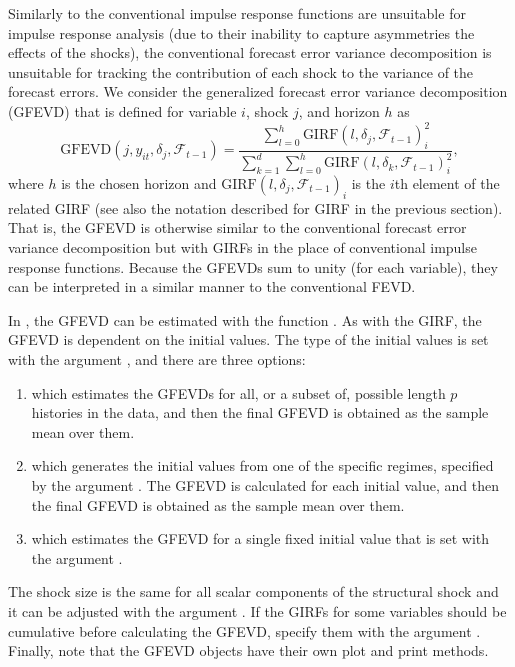 \documentclass[nojss]{jss}
\begin{document}
Similarly to the conventional impulse response functions are unsuitable for impulse response analysis (due to their inability to capture asymmetries the effects of the shocks), the conventional forecast error variance decomposition is unsuitable for tracking the contribution of each shock to the variance of the forecast errors. We consider the generalized forecast error variance decomposition (GFEVD) \citep{Lanne+Nyberg:2016}  that is defined for variable $i$, shock $j$, and horizon $h$ as
\begin{equation}
\text{GFEVD}(j,y_{it}, \delta_j,\mathcal{F}_{t-1}) = \frac{\sum_{l=0}^h\text{GIRF}(l,\delta_j,\mathcal{F}_{t-1})_i^2}{\sum_{k=1}^d\sum_{l=0}^h\text{GIRF}(l,\delta_k,\mathcal{F}_{t-1})_i^2},
\end{equation}
where $h$ is the chosen horizon and $\text{GIRF}(l,\delta_j,\mathcal{F}_{t-1})_i$ is the $i$th element of the related GIRF (see also the notation described for GIRF in the previous section). That is, the GFEVD is otherwise similar to the conventional forecast error variance decomposition but with GIRFs in the place of conventional impulse response functions. Because the GFEVDs sum to unity (for each variable), they can be interpreted in a similar manner to the conventional FEVD.

In , the GFEVD can be estimated with the function . As with the GIRF, the GFEVD is dependent on the initial values. The type of the initial values is set with the argument , and there are three options:
\begin{enumerate}
\item {} which estimates the GFEVDs for all, or a subset of, possible length $p$ histories in the data, and then the final GFEVD is obtained as the sample mean over them.
\item {} which generates the initial values from one of the specific regimes, specified by the argument . The GFEVD is calculated for each initial value, and then the final GFEVD is obtained as the sample mean over them.
\item {} which estimates the GFEVD for a single fixed initial value that is set with the argument .
\end{enumerate}
The shock size is the same for all scalar components of the structural shock and it can be adjusted with the argument . If the GIRFs for some variables should be cumulative before calculating the GFEVD, specify them with the argument . Finally, note that the GFEVD objects have their own plot and print methods.
\end{document}
